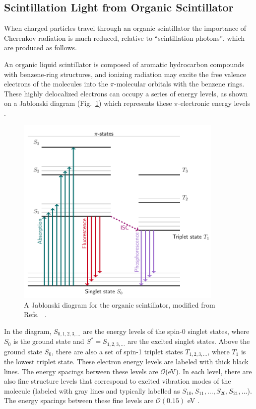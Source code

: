 \subsection{Scintillation Light from Organic Scintillator}\label{sect:scintillator}

When charged particles travel through an organic scintillator the importance of Cherenkov radiation is much reduced, relative to ``scintillation photons'', which are produced as follows. 

An organic liquid scintillator is composed of aromatic hydrocarbon compounds with benzene-ring structures, and ionizing radiation may excite the free valence electrons of the molecules into the $\pi$-molecular orbitals with the benzene rings. These highly delocalized electrons can occupy a series of energy levels, as shown on a Jablonski diagram (Fig.~\ref{jablonski}) which represents these $\pi$-electronic energy levels \cite{knoll2010radiation,leo2012techniques}. 
\begin{figure}[!htb]
	\centering
	\includegraphics[width=10cm]{jablonski.png}
	\caption[A Jablonski diagram for the organic scintillator.]{A Jablonski diagram for the organic scintillator, modified from Refs.~ \cite{birks1965theory, knoll2010radiation}.}
	\label{jablonski}
\end{figure}
In the diagram, $S_{0,1,2,3,...}$ are the energy levels of the spin-0 singlet states, where $S_0$ is the ground state and $S^*=S_{1,2,3,...}$ are the excited singlet states. Above the ground state $S_0$, there are also a set of spin-1 triplet states $T_{1,2,3,...}$, where $T_1$ is the lowest triplet state. These electron energy levels are labeled with thick black lines. The energy spacings between these levels are $\mathcal{O}$(eV). In each level, there are also fine structure levels that correspond to excited vibration modes of the molecule (labeled with gray lines and typically labelled as $S_{10}, S_{11}, ..., S_{20}, S_{21}, ...$). The energy spacings between these fine levels are $\mathcal{O}(0.15)$ eV \cite{leo2012techniques, knoll2010radiation}.

